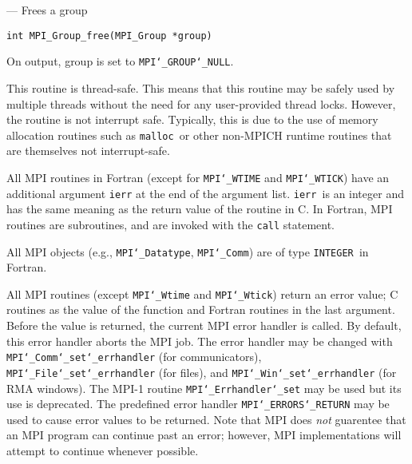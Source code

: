 \startmanpage
{}
--- Frees a group 
\startvb\begin{verbatim}
int MPI_Group_free(MPI_Group *group)

\end{verbatim}
\endvb

\par
{}
On output, group is set to {\tt MPI{\tt \char`\_}GROUP{\tt \char`\_}NULL}.
\par
{}
\par
This routine is thread-safe.  This means that this routine may be
safely used by multiple threads without the need for any user-provided
thread locks.  However, the routine is not interrupt safe.  Typically,
this is due to the use of memory allocation routines such as {\tt malloc
}or other non-MPICH runtime routines that are themselves not interrupt-safe.
\par
{}
All MPI routines in Fortran (except for {\tt MPI{\tt \char`\_}WTIME} and {\tt MPI{\tt \char`\_}WTICK}) have
an additional argument {\tt ierr} at the end of the argument list.  {\tt ierr
}is an integer and has the same meaning as the return value of the routine
in C.  In Fortran, MPI routines are subroutines, and are invoked with the
{\tt call} statement.
\par
All MPI objects (e.g., {\tt MPI{\tt \char`\_}Datatype}, {\tt MPI{\tt \char`\_}Comm}) are of type {\tt INTEGER
}in Fortran.
\par
{}
\par
All MPI routines (except {\tt MPI{\tt \char`\_}Wtime} and {\tt MPI{\tt \char`\_}Wtick}) return an error value;
C routines as the value of the function and Fortran routines in the last
argument.  Before the value is returned, the current MPI error handler is
called.  By default, this error handler aborts the MPI job.  The error handler
may be changed with {\tt MPI{\tt \char`\_}Comm{\tt \char`\_}set{\tt \char`\_}errhandler} (for communicators),
{\tt MPI{\tt \char`\_}File{\tt \char`\_}set{\tt \char`\_}errhandler} (for files), and {\tt MPI{\tt \char`\_}Win{\tt \char`\_}set{\tt \char`\_}errhandler} (for
RMA windows).  The MPI-1 routine {\tt MPI{\tt \char`\_}Errhandler{\tt \char`\_}set} may be used but
its use is deprecated.  The predefined error handler
{\tt MPI{\tt \char`\_}ERRORS{\tt \char`\_}RETURN} may be used to cause error values to be returned.
Note that MPI does {\em not} guarentee that an MPI program can continue past
an error; however, MPI implementations will attempt to continue whenever
possible.
\par
{}
\endmanpage
